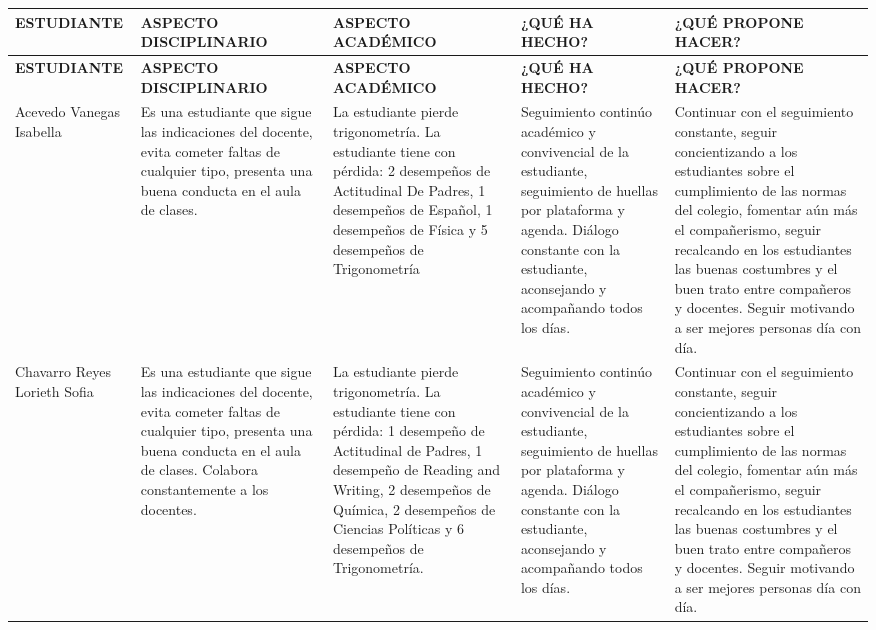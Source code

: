 \documentclass[spanish,11pt,a4paper]{article}
\begin{document}
	\begin{longtable}{|p{3.5cm}|p{3.5cm}|p{3.5cm}|p{3.5cm}|p{3.5cm}|}
		\hline
		\textbf{ESTUDIANTE} & \textbf{ASPECTO DISCIPLINARIO} & \textbf{ASPECTO ACADÉMICO} & \textbf{¿QUÉ HA HECHO?} & \textbf{¿QUÉ PROPONE HACER?} \\
		\hline \hline
		\endfirsthead
		
		\hline
		\textbf{ESTUDIANTE} & \textbf{ASPECTO DISCIPLINARIO} & \textbf{ASPECTO ACADÉMICO} & \textbf{¿QUÉ HA HECHO?} & \textbf{¿QUÉ PROPONE HACER?} \\
		\hline \hline
		\endhead
		
		Acevedo Vanegas Isabella & 
		Es una estudiante que sigue las indicaciones del docente, evita cometer faltas de cualquier tipo, presenta una buena conducta en el aula de clases. & 
		La estudiante pierde trigonometría. 
		La estudiante tiene con pérdida: 2 desempeños de Actitudinal De Padres, 1 desempeños de Español, 1 desempeños de Física y 5 desempeños de Trigonometría& 
		Seguimiento continúo académico y convivencial de la estudiante, seguimiento de huellas por plataforma y agenda. Diálogo constante con la estudiante, aconsejando y acompañando todos los días. & 
		Continuar con el seguimiento constante, seguir concientizando a los estudiantes sobre el cumplimiento de las normas del colegio, fomentar aún más el compañerismo, seguir recalcando en los estudiantes las buenas costumbres y el buen trato entre compañeros y docentes. Seguir motivando a ser mejores personas día con día.\\
		\hline
		
		Chavarro Reyes Lorieth Sofia & 
		Es una estudiante que sigue las indicaciones del docente, evita cometer faltas de cualquier tipo, presenta una buena conducta en el aula de clases. Colabora constantemente a los docentes. & 
		La estudiante pierde trigonometría.
		La estudiante tiene con pérdida: 1 desempeño de Actitudinal de Padres, 1 desempeño de Reading and Writing, 2 desempeños de Química, 2 desempeños de Ciencias Políticas y 6 desempeños de Trigonometría.& 
		Seguimiento continúo académico y convivencial de la estudiante, seguimiento de huellas por plataforma y agenda. Diálogo constante con la estudiante, aconsejando y acompañando todos los días. & 
		Continuar con el seguimiento constante, seguir concientizando a los estudiantes sobre el cumplimiento de las normas del colegio, fomentar aún más el compañerismo, seguir recalcando en los estudiantes las buenas costumbres y el buen trato entre compañeros y docentes. Seguir motivando a ser mejores personas día con día.\\
		\hline
		

\end{longtable}
\end{document}
